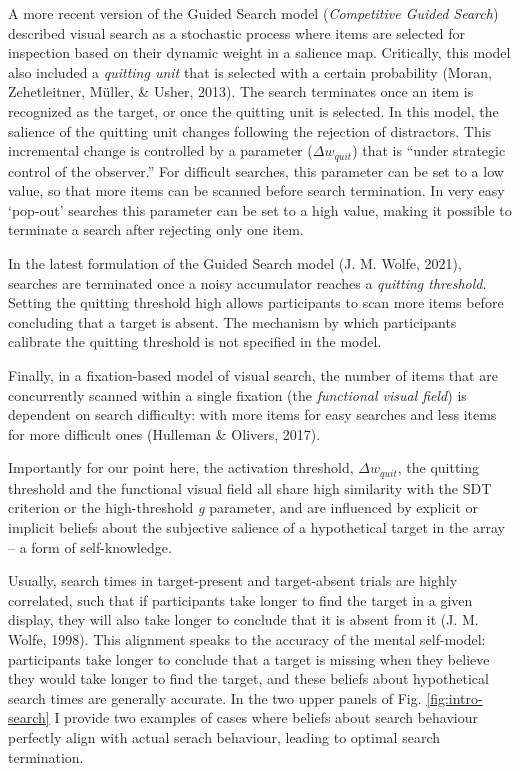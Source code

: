 \documentclass[12pt,twoside]{reedthesis}
\begin{document}
A more recent version of the Guided Search model (\emph{Competitive Guided Search}) described visual search as a stochastic process where items are selected for inspection based on their dynamic weight in a salience map. Critically, this model also included a \emph{quitting unit} that is selected with a certain probability (Moran, Zehetleitner, Müller, \& Usher, 2013). The search terminates once an item is recognized as the target, or once the quitting unit is selected. In this model, the salience of the quitting unit changes following the rejection of distractors. This incremental change is controlled by a parameter (\(\Delta w_{quit}\)) that is ``under strategic control of the observer.'' For difficult searches, this parameter can be set to a low value, so that more items can be scanned before search termination. In very easy `pop-out' searches this parameter can be set to a high value, making it possible to terminate a search after rejecting only one item.

In the latest formulation of the Guided Search model (J. M. Wolfe, 2021), searches are terminated once a noisy accumulator reaches a \emph{quitting threshold}. Setting the quitting threshold high allows participants to scan more items before concluding that a target is absent. The mechanism by which participants calibrate the quitting threshold is not specified in the model.

Finally, in a fixation-based model of visual search, the number of items that are concurrently scanned within a single fixation (the \emph{functional visual field}) is dependent on search difficulty: with more items for easy searches and less items for more difficult ones (Hulleman \& Olivers, 2017).

Importantly for our point here, the activation threshold, \(\Delta w_{quit}\), the quitting threshold and the functional visual field all share high similarity with the SDT criterion or the high-threshold \emph{g} parameter, and are influenced by explicit or implicit beliefs about the subjective salience of a hypothetical target in the array -- a form of self-knowledge.

Usually, search times in target-present and target-absent trials are highly correlated, such that if participants take longer to find the target in a given display, they will also take longer to conclude that it is absent from it (J. M. Wolfe, 1998). This alignment speaks to the accuracy of the mental self-model: participants take longer to conclude that a target is missing when they believe they would take longer to find the target, and these beliefs about hypothetical search times are generally accurate. In the two upper panels of Fig. \ref{fig:intro-search} I provide two examples of cases where beliefs about search behaviour perfectly align with actual serach behaviour, leading to optimal search termination.
\end{document}
